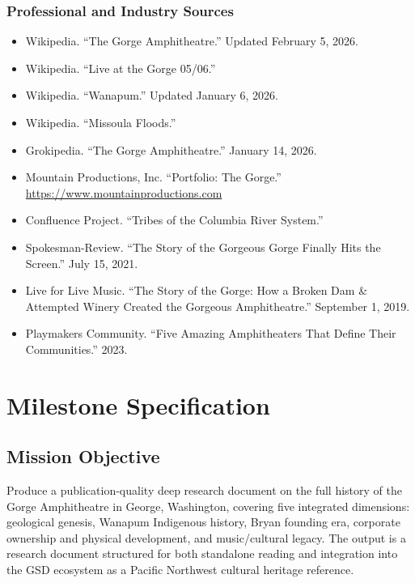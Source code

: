 \documentclass[11pt,letterpaper]{article}
\newcommand{\stageheader}[2]{%
  \noindent\colorbox{#2}{\makebox[\textwidth][l]{%
    \textcolor{white}{\bfseries\sffamily\hspace{6pt}#1\hspace{6pt}}}}%
  \vspace{0.5em}\par%
}
\begin{document}
\subsubsection{Professional and Industry Sources}
\begin{itemize}[noitemsep]
  \item Wikipedia. ``The Gorge Amphitheatre.'' Updated February 5, 2026.
  \item Wikipedia. ``Live at the Gorge 05/06.''
  \item Wikipedia. ``Wanapum.'' Updated January 6, 2026.
  \item Wikipedia. ``Missoula Floods.''
  \item Grokipedia. ``The Gorge Amphitheatre.'' January 14, 2026.
  \item Mountain Productions, Inc. ``Portfolio: The Gorge.'' \url{https://www.mountainproductions.com}
  \item Confluence Project. ``Tribes of the Columbia River System.''
  \item Spokesman-Review. ``The Story of the Gorgeous Gorge Finally Hits the Screen.'' July 15, 2021.
  \item Live for Live Music. ``The Story of the Gorge: How a Broken Dam \& Attempted Winery Created the Gorgeous Amphitheatre.'' September 1, 2019.
  \item Playmakers Community. ``Five Amazing Amphitheaters That Define Their Communities.'' 2023.
\end{itemize}

\newpage
\stageheader{STAGE 3 --- MISSION PACKAGE}{tertiary}

\section{Milestone Specification}

\subsection{Mission Objective}

Produce a publication-quality deep research document on the full history of the Gorge Amphitheatre in George, Washington, covering five integrated dimensions: geological genesis, Wanapum Indigenous history, Bryan founding era, corporate ownership and physical development, and music/cultural legacy. The output is a research document structured for both standalone reading and integration into the GSD ecosystem as a Pacific Northwest cultural heritage reference.
\end{document}
